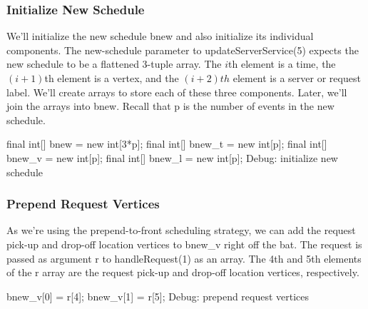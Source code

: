 \subsubsection{Initialize New Schedule}

We'll initialize the new schedule {\Tt{}bnew\nwendquote} and also initialize its individual
components. The new-schedule parameter to {\Tt{}updateServerService\nwendquote}(5) expects
the new schedule to be a flattened 3-tuple array. The $i$th element is a time,
the $(i+1)$th element is a vertex, and the $(i+2)th$ element is a server or
request label. We'll create arrays to store each of these three components.
Later, we'll join the arrays into {\Tt{}bnew\nwendquote}. Recall that {\Tt{}p\nwendquote} is the number
of events in the new schedule.

\nwenddocs{}\endmoddef\nwstartdeflinemarkup{}\nwenddeflinemarkup
final int[] bnew = new int[3*p];
final int[] bnew_t = new int[p];
final int[] bnew_v = new int[p];
final int[] bnew_l = new int[p];
\LA{}Debug: initialize new schedule~{\nwtagstyle{}}\RA{}
\nwendcode{}\nwdocspar

\subsubsection{Prepend Request Vertices}

As we're using the prepend-to-front scheduling strategy, we can add the request
pick-up and drop-off location vertices to {\Tt{}bnew{\_}v\nwendquote} right off the bat. The
request is passed as argument {\Tt{}r\nwendquote} to {\Tt{}handleRequest\nwendquote}(1) as an array. The
4th and 5th elements of the {\Tt{}r\nwendquote} array are the request pick-up and drop-off
location vertices, respectively.

\nwenddocs{}\endmoddef\nwstartdeflinemarkup{}\nwenddeflinemarkup
bnew_v[0] = r[4];
bnew_v[1] = r[5];
\LA{}Debug: prepend request vertices~{\nwtagstyle{}}\RA{}
\nwendcode{}\nwdocspar

